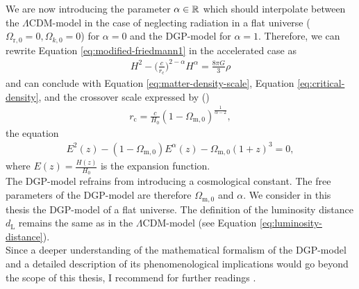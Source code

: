 \noindent We are now introducing the parameter $\alpha \in \mathbb{R}$ which should interpolate between the $\Lambda$CDM-model in the case of neglecting radiation in a flat universe ($\Omega_{\text{r},0} = 0, \Omega_{k,0} = 0$) for $\alpha = 0$ and the DGP-model for $\alpha = 1$. Therefore, we can rewrite Equation \eqref{eq:modified-friedmann1} in the accelerated case as 
\begin{align}
    H^{2} - \biggl(\frac{c}{r_{\text{c}}} \biggr)^{2 - \alpha} H^{\alpha} = \frac{8 \pi G}{3} \rho
\end{align}
and can conclude with Equation \eqref{eq:matter-density-scale}, Equation \eqref{eq:critical-density}, and the crossover scale expressed by (\cite[p.~3]{Dvali2003})
\begin{align}
    r_{\text{c}} = \frac{c}{H_{0}}(1 - \Omega_{\text{m},0})^{\frac{1}{\alpha - 2}}, 
\end{align}
the equation 
\begin{align}
    E^{2}(z) - (1 - \Omega_{\text{m},0}) E^{\alpha}(z) - \Omega_{\text{m},0} (1 + z)^3 = 0, \label{eq:dgp-friedmann-interpolation} 
\end{align}
where $\displaystyle E(z) = \frac{H(z)}{H_{0}}$ is the expansion function. \\

\noindent The DGP-model refrains from introducing a cosmological constant. The free parameters of the DGP-model are therefore $\Omega_{\text{m},0}$ and $\alpha$.
We consider in this thesis the DGP-model of a flat universe. The definition of the luminosity distance $d_{\text{L}}$ remains the same as in the $\Lambda$CDM-model (see Equation \eqref{eq:luminosity-distance}). \\
Since a deeper understanding of the mathematical formalism of the DGP-model and a detailed description of its phenomenological implications would go beyond the scope of this thesis, I recommend for further readings \cite{Lue2006}.
